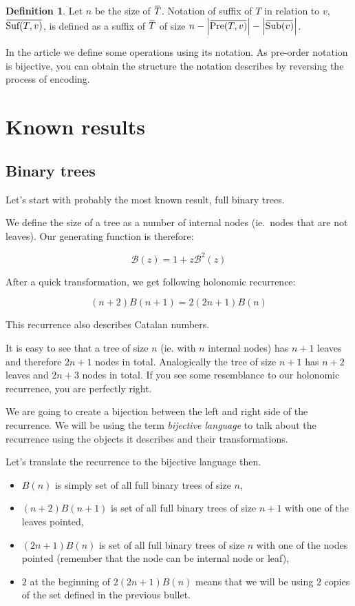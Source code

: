 \documentclass[final]{article}
\theoremstyle{definition}
\newtheorem{definition}{Definition}[subsection]
\theoremstyle{remark}
\newcommand{\ols}[1]{\mskip.5\thinmuskip\overline{\mskip-.5\thinmuskip {#1} \mskip-.5\thinmuskip}\mskip.5\thinmuskip} %
\newcommand{\gf}[1]{\ensuremath{\mathcal{#1}}}
\newcommand{\enc}[1]{\ensuremath{\ols{#1}}}
\newcommand{\size}[1]{\ensuremath{\left|#1\right|}}
\DeclareMathOperator{\tSub}{\text{Sub}}
\DeclareMathOperator{\tPre}{\text{Pre}}
\DeclareMathOperator{\tSuf}{\text{Suf}}
\begin{document}
\begin{definition}
    Let \(n\) be the size of \enc{T}. Notation of suffix of \(T\) in relation to \(v\), \(\enc{\tSuf(T, v)}\), is defined as a suffix of \enc{T} of size \(n - \size{\enc{\tPre(T, v)}} - \size{\enc{\tSub(v)}}\).
\end{definition}

In the article we define some operations using its notation. As pre-order notation is bijective, you can obtain the structure the notation describes by reversing the process of encoding.

\section{Known results}%
\label{sec:known_results}

\subsection{Binary trees}%
\label{sub:binary_trees}



Let's start with probably the most known result, full binary trees\cite{binary}.

We define the size of a tree as a number of internal nodes (ie.\ nodes that are not leaves). Our generating function is therefore:

\[\gf{B}(z) = 1 + z\gf{B}^2(z)\]

After a quick transformation, we get following holonomic recurrence:

\[(n + 2)B(n + 1) = 2 (2n + 1)B(n)\]

This recurrence also describes Catalan numbers.

It is easy to see that a tree of size \(n\) (ie. with \(n\) internal nodes) has \(n + 1\) leaves and therefore \(2n + 1\) nodes in total. Analogically the tree of size \(n + 1\) has \(n + 2\) leaves and \(2n + 3\) nodes in total. If you see some resemblance to our holonomic recurrence, you are perfectly right.

We are going to create a bijection between the left and right side of the recurrence. We will be using the term \textit{bijective language} to talk about the recurrence using the objects it describes and their transformations.

Let's translate the recurrence to the bijective language then.
\begin{itemize}
    \item \(B(n)\) is simply set of all full binary trees of size \(n\),
    \item \((n + 2) B(n + 1)\) is set of all full binary trees of size \(n + 1\) with one of the leaves pointed,
    \item \((2n + 1) B(n)\) is set of all full binary trees of size \(n\) with one of the nodes pointed (remember that the node can be internal node or leaf),
    \item \(2\) at the beginning of \(2 (2n + 1) B(n)\) means that we will be using \(2\) copies of the set defined in the previous bullet.
\end{itemize}
\end{document}
